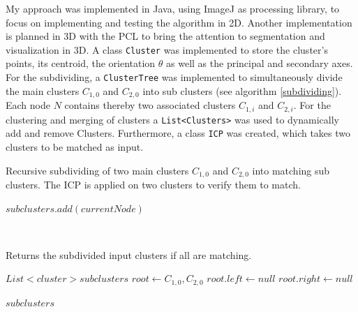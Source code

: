 \documentclass[notitlepage,english]{hgbreport}
\begin{document}
	My approach was implemented in Java, using ImageJ as processing library, to focus on implementing and testing the algorithm in 2D. Another implementation is planned in 3D with the PCL to bring the attention to segmentation and visualization in 3D. A class \texttt{Cluster} was implemented to store the cluster's points, its centroid, the orientation $\theta$ as well as the principal and secondary axes. For the subdividing, a \texttt{ClusterTree} was implemented to simultaneously divide the main clusters $C_{1,0}$ and $C_{2,0}$ into sub clusters (see algorithm \ref{subdividing}). Each node $N$ contains thereby two associated clusters $C_{1,i}$ and $C_{2,i}$. For the clustering and merging of clusters a \texttt{List<Clusters>} was used to dynamically add and remove Clusters. Furthermore, a class \texttt{ICP} was created, which takes two clusters to be matched as input.
	\begin{algorithm}[tbp]
		\caption{Recursive subdividing of two main clusters $C_{1,0}$ and $C_{2,0}$ into matching sub clusters. The ICP is applied on two clusters to verify them to match.}
		\label{alg:clustering}
		
		\begin{algorithmic}[1]     %
			\label{subdividing}
			
			\State $subclusters.add(currentNode)$
			
			\Else
			\State {}
			\State {}
			\State {}
			
			\EndIf
			\\
			
			\EndProcedure	
			
			
			\Statex Returns the subdivided input clusters if all are matching.
			
						\State $List<cluster> subclusters$
						\State $root \gets C_{1,0}, C_{2,0}$
						\State $root.left \gets null$
						\State $root.right \gets null$
						
						
						\State\Return $\mathit{subclusters}$
			
			\EndProcedure
		\end{algorithmic}
	\end{algorithm}
	
\end{document}
